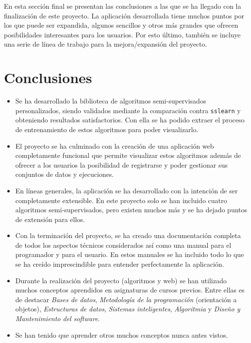
En esta sección final se presentan las conclusiones a las que se ha llegado con
la finalización de este proyecto. La aplicación desarrollada tiene muchos puntos
por los que puede ser expandida, algunos sencillos y otros más grandes que
ofrecen posibilidades interesantes para los usuarios. Por esto último, también
se incluye una serie de línea de trabajo para la mejora/expansión del proyecto.

\section{Conclusiones}

\begin{itemize}
    \item Se ha desarrollado la biblioteca de algoritmos semi-supervisados
    personalizados, siendo validados mediante la comparación contra
    \texttt{sslearn} y obteniendo resultados satisfactorios. Con ella se ha
    podido extraer el proceso de entrenamiento de estos algoritmos para poder
    visualizarlo.
    \item El proyecto se ha culminado con la creación de una aplicación web
    completamente funcional que permite visualizar estos algoritmos además de
    ofrecer a los usuarios la posibilidad de registrarse y poder gestionar sus
    conjuntos de datos y ejecuciones.
    \item En líneas generales, la aplicación se ha desarrollado con la intención
    de ser completamente extensible. En este proyecto solo se han incluido
    cuatro algoritmos semi-supervisados, pero existen muchos más y se ha dejado
    puntos de extensión para ellos.
    \item Con la terminación del proyecto, se ha creado una documentación
    completa de todos los aspectos técnicos considerados así como una manual
    para el programador y para el usuario. En estos manuales se ha incluido todo
    lo que se ha creído imprescindible para entender perfectamente la
    aplicación.
    \item Durante la realización del proyecto (algoritmos y web) se han
    utilizado muchos conceptos aprendidos en asignaturas de cursos previos.
    Entre ellas es de destacar \emph{Bases de datos}, \emph{Metodología de la
    programación} (orientación a objetos), \emph{Estructuras de datos},
    \emph{Sistemas inteligentes}, \emph{Algoritmia} y \emph{Diseño y
    Mantenimiento del software}.
    \item Se han tenido que aprender otros muchos conceptos nunca antes vistos.

\end{itemize}
